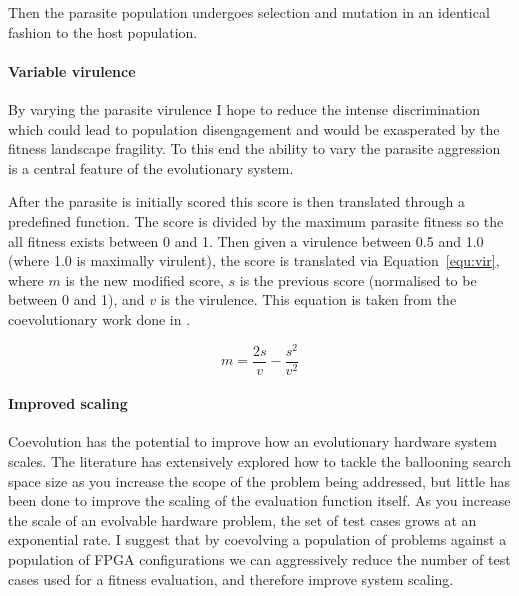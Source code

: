 Then the parasite population undergoes selection and mutation in an identical
fashion to the host population.

\paragraph{Variable virulence}
By varying the parasite virulence I hope to reduce the intense discrimination
which could lead to population disengagement and would be exasperated by the
fitness landscape fragility. To this end the ability to vary the parasite
aggression is a central feature of the evolutionary system.

After the parasite is initially scored this score is then translated through
a predefined function. The score is divided by the maximum parasite fitness so
the all fitness exists between 0 and 1. Then given a virulence
between 0.5 and 1.0 (where 1.0 is maximally virulent), the score is translated
via Equation~\ref{equ:vir}, where $m$ is the new modified score, $s$ is the
previous score (normalised to be between 0 and 1), and $v$ is the virulence.
This equation is taken from the coevolutionary work done in \cite{6790490}.

\begin{equation}
	\label{equ:vir}
	m = \frac{2s}{v} - \frac{s^2}{v^2}
\end{equation}

\paragraph{Improved scaling}
Coevolution has the potential to improve how an evolutionary hardware system scales.
The literature has extensively explored how to tackle the ballooning search space size
as you increase the scope of the problem being addressed, but little has been done
to improve the scaling of the evaluation function itself. As you increase the scale
of an evolvable hardware problem, the set of test cases grows at an exponential rate.
I suggest that by coevolving a population of problems against a population of FPGA
configurations we can aggressively reduce the number of test cases used for a fitness
evaluation, and therefore improve system scaling.

